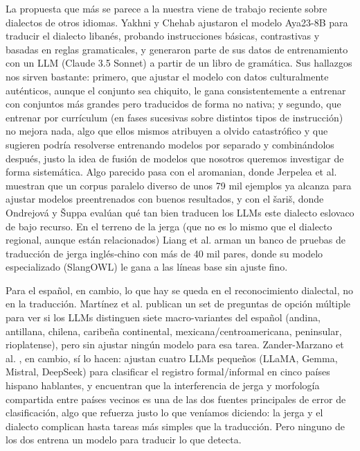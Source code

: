 \documentclass[11pt,a4paper]{article}
\begin{document}
La propuesta que más se parece a la nuestra viene de trabajo reciente sobre dialectos de otros idiomas. Yakhni y Chehab \cite{yakhni2025lebanese} ajustaron el modelo Aya23-8B para traducir el dialecto libanés, probando instrucciones básicas, contrastivas y basadas en reglas gramaticales, y generaron parte de sus datos de entrenamiento con un LLM (Claude 3.5 Sonnet) a partir de un libro de gramática. Sus hallazgos nos sirven bastante: primero, que ajustar el modelo con datos culturalmente auténticos, aunque el conjunto sea chiquito, le gana consistentemente a entrenar con conjuntos más grandes pero traducidos de forma no nativa; y segundo, que entrenar por currículum (en fases sucesivas sobre distintos tipos de instrucción) no mejora nada, algo que ellos mismos atribuyen a olvido catastrófico y que sugieren podría resolverse entrenando modelos por separado y combinándolos después, justo la idea de fusión de modelos que nosotros queremos investigar de forma sistemática. Algo parecido pasa con el aromanian, donde Jerpelea et al. \cite{jerpelea2025aromanian} muestran que un corpus paralelo diverso de unos 79 mil ejemplos ya alcanza para ajustar modelos preentrenados con buenos resultados, y con el šariš, donde Ondrejová y Šuppa \cite{ondrejova2024saris} evalúan qué tan bien traducen los LLMs este dialecto eslovaco de bajo recurso. En el terreno de la jerga (que no es lo mismo que el dialecto regional, aunque están relacionados) Liang et al. \cite{liang2025slangdit} arman un banco de pruebas de traducción de jerga inglés-chino con más de 40 mil pares, donde su modelo especializado (SlangOWL) le gana a las líneas base sin ajuste fino.

Para el español, en cambio, lo que hay se queda en el reconocimiento dialectal, no en la traducción. Martínez et al. \cite{martinez2025spanish} publican un set de preguntas de opción múltiple para ver si los LLMs distinguen siete macro-variantes del español (andina, antillana, chilena, caribeña continental, mexicana/centroamericana, peninsular, rioplatense), pero sin ajustar ningún modelo para esa tarea. Zander-Marzano et al. \cite{zander2026register}, en cambio, sí lo hacen: ajustan cuatro LLMs pequeños (LLaMA, Gemma, Mistral, DeepSeek) para clasificar el registro formal/informal en cinco países hispano hablantes, y encuentran que la interferencia de jerga y morfología compartida entre países vecinos es una de las dos fuentes principales de error de clasificación, algo que refuerza justo lo que veníamos diciendo: la jerga y el dialecto complican hasta tareas más simples que la traducción. Pero ninguno de los dos entrena un modelo para traducir lo que detecta.
\end{document}
